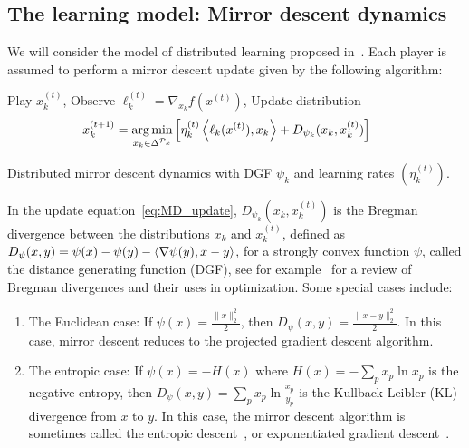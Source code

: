 \documentclass{sig-alternate-ipsn13}
\begin{document}
\subsection{The learning model: Mirror descent dynamics}
\label{sec:learning}
We will consider the model of distributed learning proposed in~\cite{krichene2015MD}. Each player is assumed to perform a mirror descent update given by the following algorithm:
\begin{algorithm}[H]
\small
\begin{algorithmic}[1]
\STATE Play $x^{(t)}_k$,
\STATE Observe $\ell_k^{(t)} = \nabla_{x_k} f(x^{(t)})$,
\STATE Update distribution
\begin{equation}
\hspace{-.2in}x^{(t+1)}_k = \argmin_{x_k \in \Delta^{\Pcal_k}} \left[ \eta_k^{(t)} \braket{\ell_k(x^{(t)})}{x_k} + D_{\psi_k}(x_k, x^{(t)}_k) \right]
\label{eq:MD_update}
\end{equation}
\ENDFOR
\ENDFOR
\end{algorithmic}
\caption{\small Distributed mirror descent dynamics with DGF $\psi_k$ and learning rates $(\eta_k^{(t)})$.}
\label{alg:MD}
\end{algorithm}
In the update equation~\eqref{eq:MD_update}, $D_{\psi_k}(x_k, x^{(t)}_k)$ is the Bregman divergence between the distributions $x_k$ and $x_k^{(t)}$, defined as $D_\psi(x, y) = \psi(x) - \psi(y) - \left\langle \nabla \psi(y), x - y \right\rangle$, for a strongly convex function $\psi$, called the distance generating function (DGF), see for example~\cite{censor1997parallel,banerjee2005clustering} for a review of Bregman divergences and their uses in optimization. Some special cases include:
\begin{enumerate}[topsep=.5ex,itemsep=0ex,label=\alph*)]
\item The Euclidean case: If $\psi(x) = \frac{\|x\|^2_2}{2}$, then $D_\psi(x, y) = \frac{\|x - y\|_2^2}{2}$. In this case, mirror descent reduces to the projected gradient descent algorithm.
\item The entropic case: If $\psi(x) = - H(x)$ where $H(x) = -\sum_{p} x_p \ln x_p$ is the negative entropy, then $D_\psi(x, y) = \sum_p x_p \ln \frac{x_p}{y_p}$ is the Kullback-Leibler (KL) divergence from $x$ to $y$. In this case, the mirror descent algorithm is sometimes called the entropic descent~\cite{beck2003mirror}, or exponentiated gradient descent~\cite{kivinen1997exponentiated}.
\end{enumerate}
\end{document}
